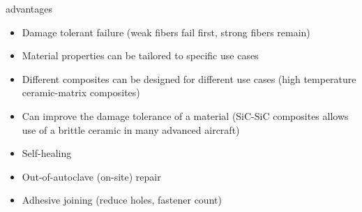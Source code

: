 \documentclass[10pt]{beamer}
\begin{document}
	\begin{frame}{advantages}
		\begin{itemize}[<+->]
			\item Damage tolerant failure (weak fibers fail first, strong fibers remain)
			\item Material properties can be tailored to specific use cases
			\item Different composites can be designed for different use cases (high temperature ceramic-matrix composites)
			\item Can improve the damage tolerance of a material (SiC-SiC composites allows use of a brittle ceramic in many advanced aircraft)
			\item Self-healing
			\item Out-of-autoclave (on-site) repair
			\item Adhesive joining (reduce holes, fastener count)
		\end{itemize}
	\end{frame}
\end{document}
